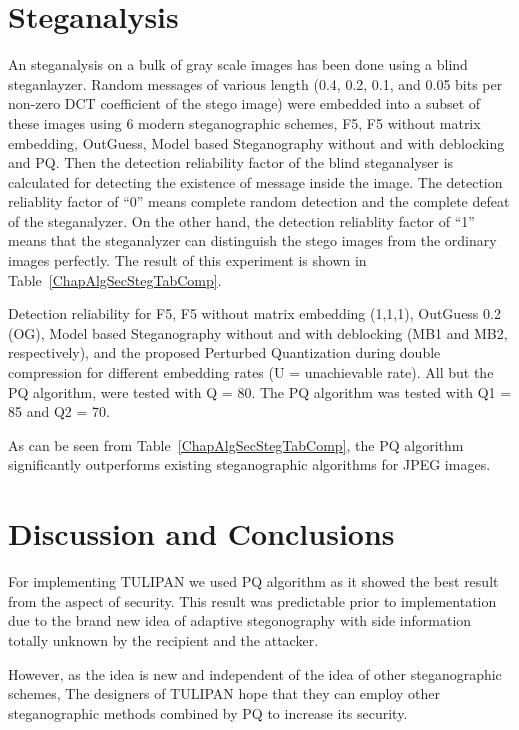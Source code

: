 \section{Steganalysis}
An steganalysis on a bulk of gray scale images has been done using a blind steganlayzer. Random messages of various length (0.4, 0.2, 0.1, and 0.05 bits per non-zero DCT coefficient of the stego image)  were embedded into a subset of these images using 6 modern steganographic schemes, F5, F5 without matrix embedding, OutGuess, Model based Steganography without and with deblocking and PQ. Then the detection reliability factor of the blind steganalyser is calculated for detecting the existence of message inside the image. The detection reliablity factor of ``0'' means complete random detection and the complete defeat of the steganalyzer. On the other hand, the detection reliablity factor of ``1'' means that the steganalyzer can distinguish the stego images from the ordinary images perfectly. The result of this experiment is shown in Table~\ref{ChapAlgSecStegTabComp}.

\begin{table}
\begin{center}
\caption{Detection reliability  for F5, F5 without matrix embedding (1,1,1), OutGuess 0.2 (OG), Model based Steganography without and with deblocking (MB1 and MB2, respectively), and the proposed Perturbed Quantization during double compression for different embedding rates (U =
unachievable rate). All but the PQ algorithm, were tested with Q = 80. The PQ algorithm was tested with Q1 = 85 and Q2 = 70.} 
\label{ChapAlgSecStegTabComp}
\end{center}
\end{table}

As can be seen from Table~\ref{ChapAlgSecStegTabComp}, the PQ algorithm significantly outperforms existing steganographic algorithms for JPEG images. 

\section{Discussion and Conclusions}

For implementing TULIPAN we used PQ algorithm as it showed the best result from the aspect of security. This result was predictable prior to  implementation due to the brand new idea of adaptive stegonography with side information totally unknown by the recipient and the attacker. 

However, as the idea is new and independent of the idea of other steganographic schemes, The designers of TULIPAN hope that they can employ other steganographic methods combined by PQ to increase its security.